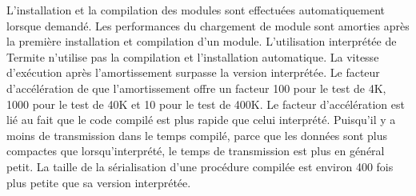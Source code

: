 L'installation et la compilation des modules sont effectuées automatiquement
lorsque demandé.  Les performances du chargement de module sont amorties après
la première installation et compilation d'un module. L'utilisation interprétée
de Termite n'utilise pas la compilation et l'installation automatique.  La
vitesse d'exécution après l'amortissement surpasse la version interprétée.  Le
facteur d'accélération de que l'amortissement offre un facteur 100 pour le test
de 4K, 1000 pour le test de 40K et 10 pour le test de 400K.  Le facteur
d'accélération est lié au fait que le code compilé est plus rapide que celui
interprété.  Puisqu'il y a moins de transmission dans le temps compilé, parce
que les données sont plus compactes que lorsqu'interprété, le temps de
transmission est plus en général petit. La taille de la sérialisation d'une
procédure compilée est environ 400 fois plus petite que sa version interprétée.


